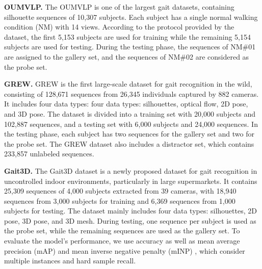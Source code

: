 \documentclass[10pt,twocolumn,letterpaper]{article}
\begin{document}
\noindent\textbf{OUMVLP.} The OUMVLP \cite{NorikoTakemura2018MultiviewLP} is one of the largest gait datasets, containing silhouette sequences of 10,307 subjects. Each subject has a single normal walking condition (NM) with 14 views. According to the protocol provided by the dataset, the first 5,153 subjects are used for training while the remaining 5,154 subjects are used for testing. During the testing phase, the sequences of NM\#01 are assigned to the gallery set, and the sequences of NM\#02 are considered as the probe set.

\noindent\textbf{GREW.} GREW \cite{zhu2021gait} is the first large-scale dataset for gait recognition in the wild, consisting of 128,671 sequences from 26,345 individuals captured by 882 cameras. It includes four data types: four data types: silhouettes, optical flow, 2D pose, and 3D pose. The dataset is divided into a training set with 20,000 subjects and 102,887 sequences, and a testing set with 6,000 subjects and 24,000 sequences. In the testing phase, each subject has two sequences for the gallery set and two for the probe set. The GREW dataset also includes a distractor set, which contains 233,857 unlabeled sequences.


\noindent\textbf{Gait3D.} The Gait3D dataset \cite{zheng2022gait} is a newly proposed dataset for gait recognition in uncontrolled indoor environments, particularly in large supermarkets. It contains 25,309 sequences of 4,000 subjects extracted from 39 cameras, with 18,940 sequences from 3,000 subjects for training and 6,369 sequences from 1,000 subjects for testing. The dataset mainly includes four data types: silhouettes, 2D pose, 3D pose, and 3D mesh. During testing, one sequence per subject is used as the probe set, while the remaining sequences are used as the gallery set.  To evaluate the model's performance, we use accuracy as well as mean average precision (mAP) and mean inverse negative penalty (mINP) \cite{ye2021deep}, which consider multiple instances and hard sample recall.



\end{document}
